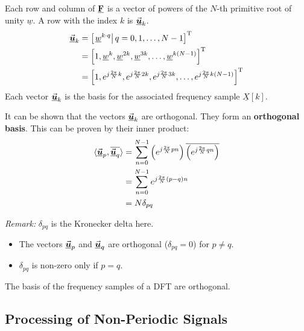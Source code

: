 \begin{refsection}
Each row and column of $\underline{\bm{\mathrm{F}}}$ is a vector of powers of the $N$-th primitive root of unity $\underline{w}$. A row with the index $k$ is $\vec{\bm{\underline{u}}}_k$.
\begin{equation}
	\begin{split}
		\vec{\bm{\underline{u}}}_k &= \left[\left.\underline{w}^{k \cdot q}\right| q = 0, 1, \dots, N-1\right]^{\mathrm{T}} \\
		 &= \left[1, \underline{w}^{k}, \underline{w}^{2 k}, \underline{w}^{3 k}, \dots, \underline{w}^{k \left(N-1\right)} \right]^{\mathrm{T}} \\
		 &= \left[1, e^{j \frac{2 \pi}{N} k}, e^{j \frac{2 \pi}{N} 2 k}, e^{j \frac{2 \pi}{N} 3 k}, \dots, e^{j \frac{2 \pi}{N} k \left(N-1\right)} \right]^{\mathrm{T}} \\
	\end{split}
\end{equation}
Each vector $\vec{\bm{\underline{u}}}_k$ is the basis for the associated frequency sample $\underline{X}[k]$.

It can be shown that the vectors $\vec{\bm{\underline{u}}}_k$ are orthogonal. They form an  \textbf{orthogonal basis}. This can be proven by their inner product:
\begin{equation}
	\begin{split}
		\langle \vec{\bm{\underline{u}}}_p, \overline{\vec{\bm{\underline{u}}}_q} \rangle &= \sum\limits_{n=0}^{N-1} \left(e^{j \frac{2 \pi}{N} p n}\right) \overline{\left(e^{j \frac{2 \pi}{N} q n}\right)} \\
		 &= \sum\limits_{n=0}^{N-1} e^{j \frac{2 \pi}{N} \left(p - q\right) n} \\
		 &= N \delta_{pq}
	\end{split}
\end{equation}

\textit{Remark:} $\delta_{pq}$ is the Kronecker delta here.

\begin{itemize}
	\item The vectors $\vec{\bm{\underline{u}}}_p$ and $\vec{\bm{\underline{u}}}_q$ are orthogonal ($\delta_{pq} = 0$) for $p \neq q$.
	\item $\delta_{pq}$ is non-zero only if $p = q$.
\end{itemize}

\begin{fact}
	The basis of the frequency samples of a \ac{DFT} are orthogonal.
\end{fact}

\subsection{Processing of Non-Periodic Signals}


\end{refsection}
